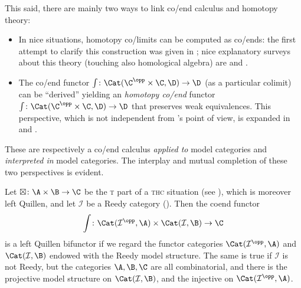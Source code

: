 This said, there are mainly two ways to link co/end calculus and homotopy theory:
\begin{itemize}
\item In nice situations, homotopy co/limits can be computed as co/ends: the first attempt to clarify this construction was given in \cite{MR0365573}; nice explanatory surveys about this theory (touching also homological algebra) are \cite{hormann2014homotopy} and \cite{Gamb}.%
\item The co/end functor $\int\colon \Cat(\C^\opp\times\C,\D)\to \D$ (as a particular colimit) can be ``derived'' yielding an \emph{homotopy co/end} functor $\int\colon \Cat(\C^\opp\times\C,\D)\to \D$ that preserves weak equivalences. This perspective, which is not independent from \cite{cordier1997homotopy}'s point of view, is expanded in \cite{DrorFar98} and \cite{Isaacson}.
\end{itemize}
These are respectively a co/end calculus \emph{applied to} model categories and \emph{interpreted in} model categories. The interplay and mutual completion of these two perspectives is evident.

\begin{remark}
Let $\boxtimes \colon \A \times \B \to \C$ be the \textsc{t} part of a \textsc{thc} situation (see ), which is moreover left Quillen, and let $\mathcal{I}$ be a Reedy category (\cite[\adef\textbf{5.2.1}]{Hov}). Then the coend functor
\[
\int \colon \Cat(\mathcal{I}^\opp,\A) \times \Cat(\mathcal{I},\B) \to \C
\]
is a left Quillen bifunctor if we regard the functor categories $\Cat(\mathcal{I}^\opp,\A)$ and $\Cat(\mathcal{I},\B)$ endowed with the Reedy model structure. The same is true if $\mathcal{I}$ is not Reedy, but the categories $\A,\B,\C$ are all combinatorial, and there is the projective model structure on $\Cat(\mathcal{I},\B)$, and the injective on $\Cat(\mathcal{I}^\opp,\A)$.
\end{remark}

